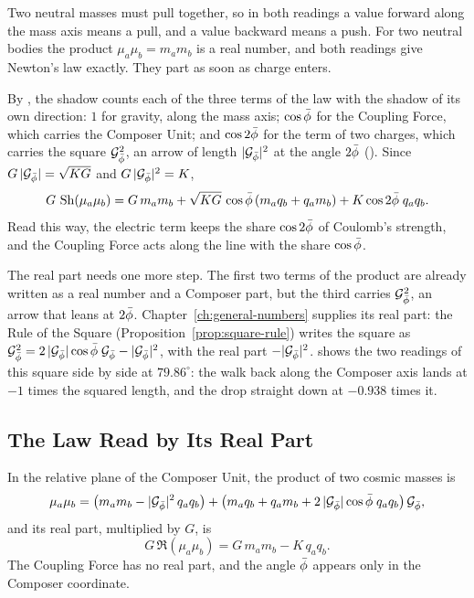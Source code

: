 Two neutral masses must pull together, so in both readings a value forward along the mass axis means a pull, and a value backward means a push. For two neutral bodies the product $\mu_a\mu_b = m_a m_b$ is a real number, and both readings give Newton's law exactly. They part as soon as charge enters.

By , the shadow counts each of the three terms of the law with the shadow of its own direction: $1$ for gravity, along the mass axis; $\cos\bar{\phi}$ for the Coupling Force, which carries the Composer Unit; and $\cos 2\bar{\phi}$ for the term of two charges, which carries the square $\mathcal{G}_{\bar{\phi}}^2$, an arrow of length $|\mathcal{G}_{\bar{\phi}}|^2$ at the angle $2\bar{\phi}$ (). Since $G\,|\mathcal{G}_{\bar{\phi}}| = \sqrt{KG}$ and $G\,|\mathcal{G}_{\bar{\phi}}|^2 = K$,
\[
G\,\operatorname{Sh}(\mu_a\mu_b) = G\,m_a m_b + \sqrt{KG}\,\cos\bar{\phi}\,(m_a q_b + q_a m_b) + K\cos 2\bar{\phi}\;q_a q_b .
\]
Read this way, the electric term keeps the share $\cos 2\bar{\phi}$ of Coulomb's strength, and the Coupling Force acts along the line with the share $\cos\bar{\phi}$.

The real part needs one more step. The first two terms of the product are already written as a real number and a Composer part, but the third carries $\mathcal{G}_{\bar{\phi}}^2$, an arrow that leans at $2\bar{\phi}$. Chapter~\ref{ch:general-numbers} supplies its real part: the Rule of the Square (Proposition~\ref{prop:square-rule}) writes the square as $\mathcal{G}_{\bar{\phi}}^2 = 2\,|\mathcal{G}_{\bar{\phi}}|\cos\bar{\phi}\;\mathcal{G}_{\bar{\phi}} - |\mathcal{G}_{\bar{\phi}}|^2$, with the real part $-|\mathcal{G}_{\bar{\phi}}|^2$.  shows the two readings of this square side by side at $79.86^\circ$: the walk back along the Composer axis lands at $-1$ times the squared length, and the drop straight down at $-0.938$ times it.

\subsection{The Law Read by Its Real Part}\label{subsec:law-read}

\begin{proposition}\label{prop:law-real}
In the relative plane of the Composer Unit, the product of two cosmic masses is
\[
\mu_a\mu_b = \left(m_a m_b - |\mathcal{G}_{\bar{\phi}}|^2\,q_a q_b\right) + \left(m_a q_b + q_a m_b + 2\,|\mathcal{G}_{\bar{\phi}}|\cos\bar{\phi}\;q_a q_b\right)\mathcal{G}_{\bar{\phi}} ,
\]
and its real part, multiplied by $G$, is
\[
G\,\Re(\mu_a\mu_b) = G\,m_a m_b - K\,q_a q_b .
\]
The Coupling Force has no real part, and the angle $\bar{\phi}$ appears only in the Composer coordinate.
\end{proposition}

